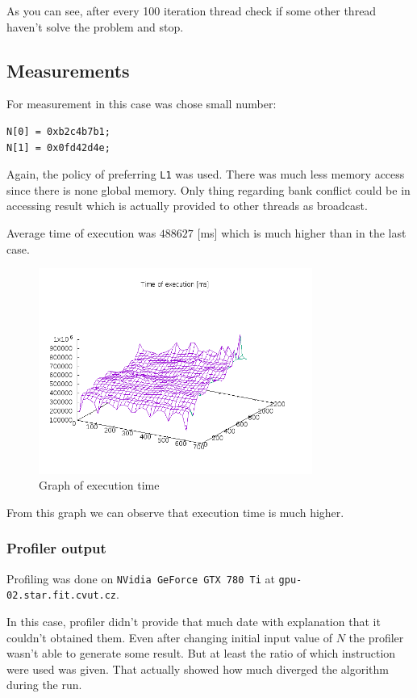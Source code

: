 \documentclass[a4paper]{article}
\begin{document}
As you can see, after every 100 iteration thread check if some other thread haven't solve the problem and stop. 


\subsection{Measurements}

For measurement in this case was chose small number:

\begin{verbatim}
N[0] = 0xb2c4b7b1;
N[1] = 0x0fd42d4e;
\end{verbatim}

Again, the policy of preferring \texttt{L1} was used. There was much less memory access since there is none global memory. Only thing regarding bank conflict could be in accessing result which is actually provided to other threads as broadcast.

Average time of execution was $488627$ [ms] which is much higher than in the last case.

\begin{figure}[H]
  \centering
    \includegraphics[width=0.8\textwidth]{graph_v2.png}
  \caption{Graph of execution time}
  \label{exec2}
\end{figure}

From this graph we can observe that execution time is much higher.

\subsubsection{Profiler output}

Profiling was done on \texttt{NVidia GeForce GTX 780 Ti} at \texttt{gpu-02.star.fit.cvut.cz}.

In this case, profiler didn't provide that much date with explanation that it couldn't obtained them. Even after changing initial input value of $N$ the profiler wasn't able to generate some result. But at least the ratio of which instruction were used was given. That actually showed how much diverged the algorithm during the run.
\end{document}

